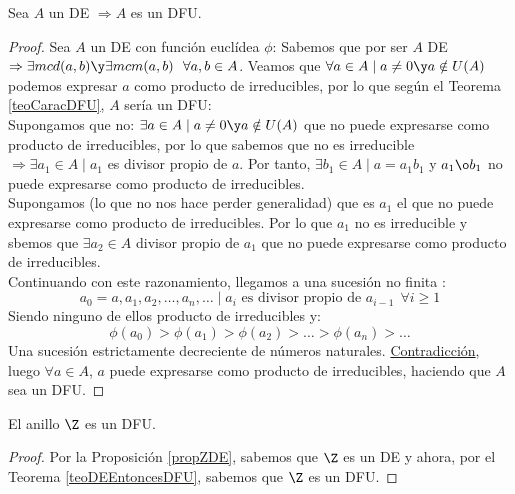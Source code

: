 \begin{teo}
    \label{teoDEEntoncesDFU}
    Sea $A$ un DE $\Rightarrow A$ es un DFU.
\begin{proof}
    Sea $A$ un DE con función euclídea $\phi$:\newline
    Sabemos que por ser $A$ DE $\Rightarrow \exists mcd(a,b) \y \exists mcm(a,b)~~\forall a,b \in A$.\newline
    Veamos que $\forall a \in A \mid a \neq 0 \y a \notin U(A)$ podemos expresar $a$ como producto de irreducibles, por lo
    que según el Teorema \ref{teoCaracDFU}, $A$ sería un DFU:\\

    
    Supongamos que no: $\exists a \in A \mid a\neq 0 \y a \notin U(A)$ que no puede expresarse como producto de irreducibles,
    por lo que sabemos que no es irreducible $\Rightarrow \exists a_1 \in A \mid a_1$ es divisor propio de $a$.\newline
    Por tanto, $\exists b_1 \in A \mid a=a_1b_1$ y $a_1 \o b_1$ no puede expresarse como producto de irreducibles.\\

    
    Supongamos (lo que no nos hace perder generalidad) que es $a_1$ el que no puede expresarse como producto de irreducibles.
    Por lo que $a_1$ no es irreducible y sbemos que $\exists a_2 \in A$ divisor propio de $a_1$ que no puede expresarse como
    producto de irreducibles.\\

    
    Continuando con este razonamiento, llegamos a una sucesión no finita :
    $$a_0 = a, a_1, a_2, \ldots, a_n, \ldots \mid a_i \mbox{ es divisor propio de } a_{i-1}~~\forall i \geq 1$$
    Siendo ninguno de ellos producto de irreducibles y:
    $$\phi(a_0) > \phi(a_1) > \phi(a_2) > \ldots > \phi(a_n) > \ldots$$
    Una sucesión estrictamente decreciente de números naturales. \underline{Contradicción}, luego $\forall a \in A$, $a$
    puede expresarse como producto de irreducibles, haciendo que $A$ sea un DFU.
\end{proof}
\end{teo}

\begin{coro}
    El anillo $\Z$ es un DFU.
\begin{proof}
    Por la Proposición \ref{propZDE}, sabemos que $\Z$ es un DE y ahora, por el Teorema \ref{teoDEEntoncesDFU}, sabemos
    que $\Z$ es un DFU.
\end{proof}
\end{coro}

